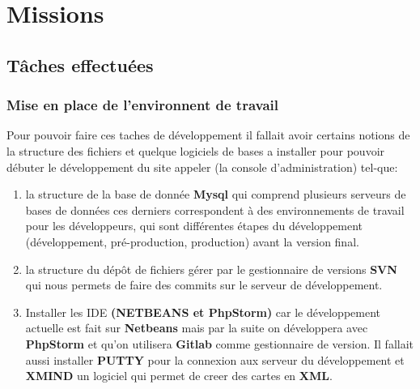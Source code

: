 \section{Missions}

\subsection{Tâches effectuées}
\subsubsection{Mise en place de l'environnent de travail}
Pour pouvoir faire ces taches de développement il fallait avoir certains notions de la structure des fichiers et quelque logiciels de bases a installer pour pouvoir débuter le développement du site appeler (la console d'administration) tel-que: 
\begin{enumerate}
\item la structure de la base de donnée \textbf{Mysql} qui comprend plusieurs serveurs de bases de données ces derniers correspondent à des environnements de travail pour les développeurs, qui sont différentes étapes du développement (développement, pré-production, production) avant la version final.
\item la structure du dépôt de fichiers gérer par le gestionnaire de versions \textbf{SVN} qui nous permets de faire des commits sur le serveur de développement.
\item Installer les IDE \textbf{(NETBEANS et PhpStorm)} car le développement actuelle est fait sur \textbf{Netbeans} mais par la suite on développera avec \textbf{PhpStorm} et qu'on utilisera \textbf{Gitlab} comme gestionnaire de version. Il fallait aussi installer \textbf{PUTTY} pour la connexion aux serveur du développement et \textbf{XMIND} un logiciel qui permet de creer des cartes en \textbf{XML}. 
\end{enumerate}
  

